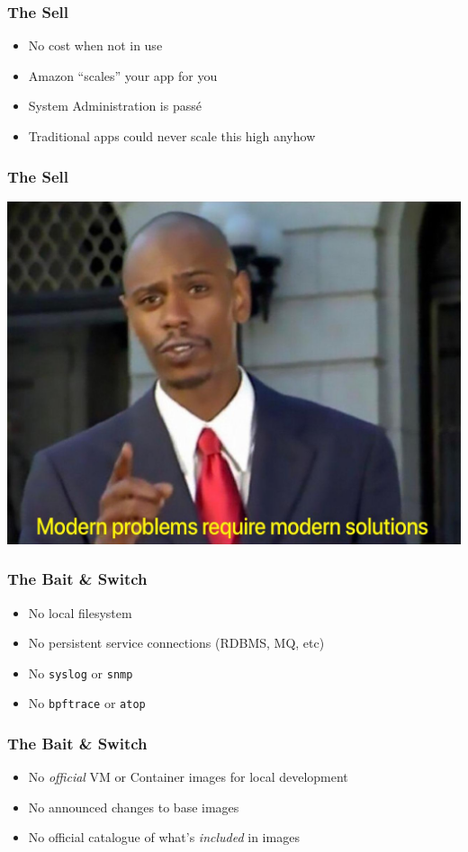 \documentclass{beamer}
\begin{document}
\begin{frame}
	\frametitle{The Sell}
	\begin{itemize}
		\item No cost when not in use
		\pause \item Amazon ``scales'' your app for you
		\pause \item System Administration is pass\'e
		\pause \item Traditional apps could never scale this high anyhow
	\end{itemize}
\end{frame}

\begin{frame}
	\frametitle{The Sell}
	\centering
	\includegraphics[scale=0.2]{modern_problems.jpg}
\end{frame}

\begin{frame}
	\frametitle{The Bait \& Switch}
	\begin{itemize}
		\item No local filesystem
		\pause \item No persistent service connections (RDBMS, MQ, etc)
		\pause \item No \texttt{syslog} or \texttt{snmp}
		\pause \item No \texttt{bpftrace} or \texttt{atop}
	\end{itemize}
\end{frame}

\begin{frame}
	\frametitle{The Bait \& Switch}
	\begin{itemize}
		\item No \emph{official} VM or Container images for local development
		\pause \item No announced changes to base images
		\pause \item No official catalogue of what's \emph{included} in images
	\end{itemize}
\end{frame}
\end{document}
